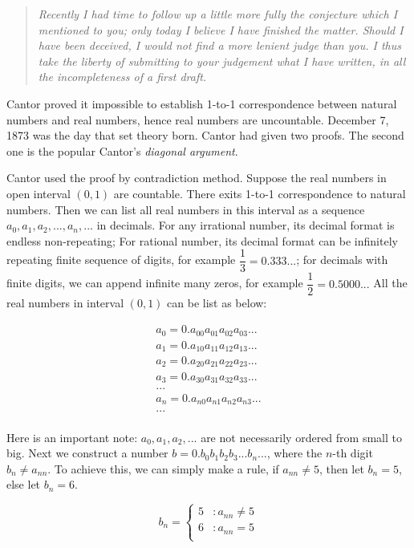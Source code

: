 \documentclass{article}
\begin{document}
\begin{quotation}
\itshape
Recently I had time to follow up a little more fully the conjecture which I mentioned to you; only today I believe I have finished the matter. Should I have been deceived, I would not find a more lenient judge than you. I thus take the liberty of submitting to your judgement what I have written, in all the incompleteness of a first draft.
\end{quotation}

Cantor proved it impossible to establish 1-to-1 correspondence between natural numbers and real numbers, hence real numbers are uncountable. December 7, 1873 was the day that set theory born. Cantor had given two proofs. The second one is the popular Cantor's {\em diagonal argument}.

Cantor used the proof by contradiction method. Suppose the real numbers in open interval $(0, 1)$ are countable. There exits 1-to-1 correspondence to natural numbers. Then we can list all real numbers in this interval as a sequence $a_0, a_1, a_2, ..., a_n, ...$ in decimals. For any irrational number, its decimal format is endless non-repeating; For rational number, its decimal format can be infinitely repeating finite sequence of digits, for example $\dfrac{1}{3} = 0.333...$; for decimals with finite digits, we can append infinite many zeros, for example $\dfrac{1}{2} = 0.5000...$ All the real numbers in interval $(0, 1)$ can be list as below:

\[
\begin{array}{l}
a_0 = 0.a_{00}a_{01}a_{02}a_{03}...\\
a_1 = 0.a_{10}a_{11}a_{12}a_{13}...\\
a_2 = 0.a_{20}a_{21}a_{22}a_{23}...\\
a_3 = 0.a_{30}a_{31}a_{32}a_{33}...\\
... \\
a_n = 0.a_{n0}a_{n1}a_{n2}a_{n3}...\\
... \\
\end{array}
\]

Here is an important note: $a_0, a_1, a_2, ...$ are not necessarily ordered from small to big. Next we construct a number $b = 0.b_0b_1b_2b_3...b_n...$, where the $n$-th digit $b_n \neq a_{nn}$. To achieve this, we can simply make a rule, if $a_{nn} \neq 5$, then let $b_n = 5$, else let $b_n = 6$.

\[
b_n = \begin{cases}
5 & : a_{nn} \neq 5 \\
6 & : a_{nn} = 5 \\
\end{cases}
\]
\end{document}
